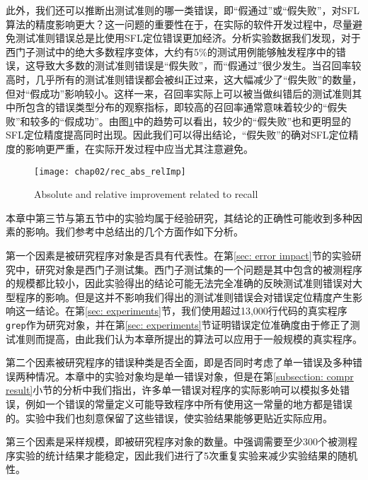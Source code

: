 此外，我们还可以推断出测试准则的哪一类错误，即“假通过”或“假失败”，对SFL算法的精度影响更大？这一问题的重要性在于，在实际的软件开发过程中，尽量避免测试准则错误总是比使用SFL定位错误更加经济。分析实验数据我们发现，对于西门子测试中的绝大多数程序变体，大约有5\%的测试用例能够触发程序中的错误，这导致大多数的测试准则错误是“假失败”，而“假通过”很少发生。当召回率较高时，几乎所有的测试准则错误都会被纠正过来，这大幅减少了“假失败”的数量，但对“假成功”影响较小。这样一来，召回率实际上可以被当做纠错后的测试准则其中所包含的错误类型分布的观察指标，即较高的召回率通常意味着较少的“假失败”和较多的“假成功”。由图\ref{fig:rec_abs_relImp}中的趋势可以看出，较少的“假失败”也和更明显的SFL定位精度提高同时出现。因此我们可以得出结论，“假失败”的确对SFL定位精度的影响更严重，在实际开发过程中应当尤其注意避免。

\begin{figure}
	\centering
	\texttt{[image: chap02/rec\_abs\_relImp]}
	\caption{Absolute and relative improvement related to recall}
	\label{fig:rec_abs_relImp}
\end{figure}


本章中第三节与第五节中的实验均属于经验研究，其结论的正确性可能收到多种因素的影响。我们参考\cite{Steimann:2013:TVV:2483760.2483767}中总结出的几个方面作如下分析。

第一个因素是被研究程序对象是否具有代表性。在第\ref{sec: error impact}节的实验研究中，研究对象是西门子测试集。西门子测试集的一个问题是其中包含的被测程序的规模都比较小，因此实验得出的结论可能无法完全准确的反映测试准则错误对大型程序的影响。但是这并不影响我们得出的测试准则错误会对错误定位精度产生影响这一结论。在第\ref{sec: experiments}节，我们使用超过13,000行代码的真实程序\texttt{grep}作为研究对象，并在第\ref{sec: experiments}节证明错误定位准确度由于修正了测试准则而提高，由此我们认为本章所提出的算法可以应用于一般规模的真实程序。

第二个因素被研究程序的错误种类是否全面，即是否同时考虑了单一错误及多种错误两种情况。本章中的实验对象均是单一错误对象，但是在第\ref{subsection: compr result}小节的分析中我们指出，许多单一错误对程序的实际影响可以模拟多处错误，例如一个错误的常量定义可能导致程序中所有使用这一常量的地方都是错误的。实验中我们也刻意保留了这些错误，使实验结果能够更贴近实际应用。

第三个因素是采样规模，即被研究程序对象的数量。\cite{Steimann:2013:TVV:2483760.2483767}中强调需要至少300个被测程序实验的统计结果才能稳定，因此我们进行了5次重复实验来减少实验结果的随机性。

